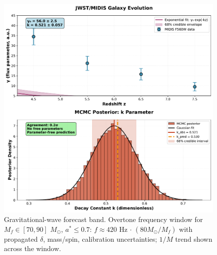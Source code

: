 \documentclass[aps,prd,preprint,onecolumn,nofootinbib,superscriptaddress,longbibliography]{revtex4-2}
\begin{document}
\begin{figure}[t]
\centering
\includegraphics[width=0.9\columnwidth]{fig4_ringdown_forecast.pdf}
\caption{Gravitational-wave forecast band. Overtone frequency window for $M_f \in [70,90]$ $M_\odot$, $a^* \leq 0.7$: $f\approx 420$ Hz $\cdot$ $(80 M_\odot/M_f)$ with propagated $\delta$, mass/spin, calibration uncertainties; $1/M$ trend shown across the window.}
\label{fig:ringdown-forecast}
\end{figure}


\end{document}
